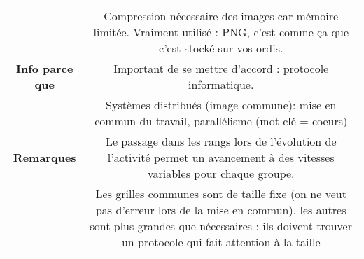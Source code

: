 \documentclass[12pt,landscape]{article}
\begin{document}
\begin{tabular}{|c|c|c|c|c|}
	\hline

	& \multicolumn{4}{|c|}{
		Compression nécessaire des images car mémoire limitée. Vraiment utilisé : PNG, c'est comme ça que c'est stocké sur vos ordis.
	}\\
	\textbf{Info parce que} & \multicolumn{4}{|c|}{
		Important de se mettre d'accord : protocole informatique.
	}\\
	& \multicolumn{4}{|c|}{
		Systèmes distribués (image commune): mise en commun du travail, parallélisme (mot clé = coeurs)
	}\\

	\hline
    \textbf{Remarques} & \multicolumn{4}{|c|}{
		Le passage dans les rangs lors de l'évolution de l'activité permet un avancement à des vitesses variables pour chaque groupe.
	}\\
	& \multicolumn{4}{|c|}{
		Les grilles communes sont de taille fixe (on ne veut pas d'erreur lors de la mise en commun), les autres sont plus grandes que nécessaires : ils doivent trouver un protocole qui fait attention à la taille
	}\\
	
    
    
	
	
	\hline
\end{tabular}
\end{document}
